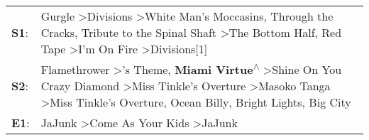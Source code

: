 \begin{supertabular}{p{0.03\textwidth}p{0.92\textwidth}}
 \textbf{S1}:  &                                          Gurgle\textsuperscript{} \textgreater \enspace Divisions\textsuperscript{} \textgreater \enspace White Man's Moccasins\textsuperscript{}, \enspace Through the Cracks\textsuperscript{}, \enspace Tribute to the Spinal Shaft\textsuperscript{} \textgreater \enspace The Bottom Half\textsuperscript{}, \enspace Red Tape\textsuperscript{} \textgreater \enspace I'm On Fire\textsuperscript{} \textgreater \enspace Divisions[1]\textsuperscript{}  \enspace  \\
 \textbf{S2}:  &  Flamethrower\textsuperscript{} \textgreater {}'s Theme\textsuperscript{}, \enspace \textbf{Miami Virtue\textsuperscript{$\wedge$}} \textgreater \enspace Shine On You Crazy Diamond\textsuperscript{} \textgreater \enspace Miss Tinkle's Overture\textsuperscript{} \textgreater \enspace Masoko Tanga\textsuperscript{} \textgreater \enspace Miss Tinkle's Overture\textsuperscript{}, \enspace Ocean Billy\textsuperscript{}, \enspace Bright Lights, Big City\textsuperscript{}  \enspace  \\
 \textbf{E1}:  &                                                                                                                                                                                                                                                                                                                                                              JaJunk\textsuperscript{} \textgreater \enspace Come As Your Kids\textsuperscript{} \textgreater \enspace JaJunk\textsuperscript{}  \enspace  \\
\end{supertabular}
